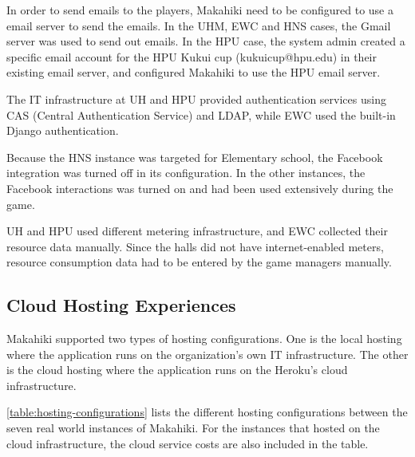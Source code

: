 In order to send emails to the players, Makahiki need to be configured to use a email server to send the emails. In the UHM, EWC and HNS cases, the Gmail server was used to send out emails. In the HPU case, the system admin created a specific email account for the HPU Kukui cup (kukuicup@hpu.edu) in their existing email server, and configured Makahiki to use the HPU email server. 

The IT infrastructure at UH and HPU provided authentication services using CAS (Central Authentication Service) and LDAP, while EWC used the built-in Django authentication.  

Because the HNS instance was targeted for Elementary school, the Facebook integration was turned off in its configuration. In the other instances, the Facebook interactions was turned on and had been used extensively during the game.

UH and HPU used different metering infrastructure, and EWC collected their resource data manually.  Since the
halls did not have internet-enabled meters, resource consumption data had to be entered by
the game managers manually.

\subsection{Cloud Hosting Experiences}
\label{section:cloud-hosting}

Makahiki supported two types of hosting configurations. One is the local hosting where the application runs on the organization's own IT infrastructure. The other is the cloud hosting where the application runs on the Heroku's cloud infrastructure.

\autoref{table:hosting-configurations} lists the different hosting configurations between the seven real world instances of Makahiki. For the instances that hosted on the cloud infrastructure, the cloud service costs are also included in the table.  

